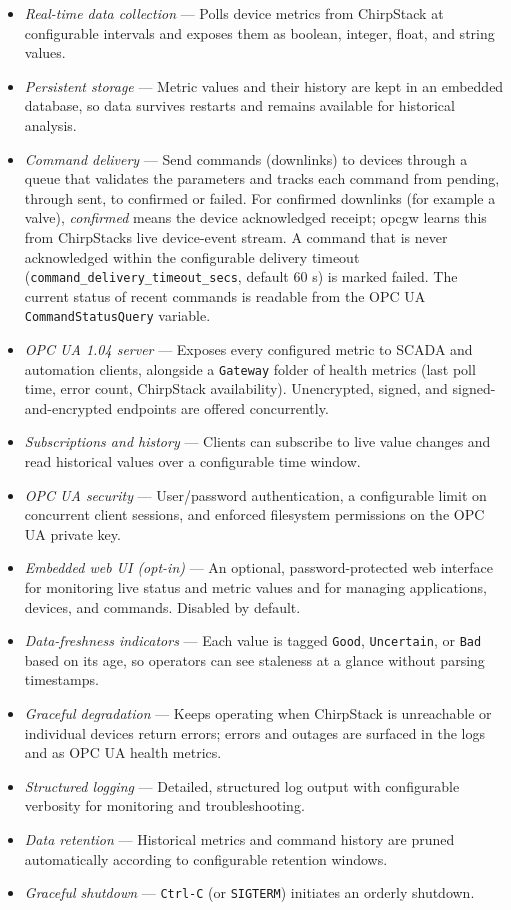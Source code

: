 \begin{itemize}
\item
  \emph{Real-time data collection} --- Polls device metrics from ChirpStack at configurable intervals and exposes them as boolean, integer, float, and string values.
\item
  \emph{Persistent storage} --- Metric values and their history are kept in an embedded database, so data survives restarts and remains available for historical analysis.
\item
  \emph{Command delivery} --- Send commands (downlinks) to devices through a queue that validates the parameters and tracks each command from pending, through sent, to confirmed or failed. For confirmed downlinks (for example a valve), \emph{confirmed} means the device acknowledged receipt; opcgw learns this from ChirpStack\textquotesingle s live device-event stream. A command that is never acknowledged within the configurable delivery timeout (\texttt{command\_delivery\_timeout\_secs}, default 60 s) is marked failed. The current status of recent commands is readable from the OPC UA \texttt{CommandStatusQuery} variable.
\item
  \emph{OPC UA 1.04 server} --- Exposes every configured metric to SCADA and automation clients, alongside a \texttt{Gateway} folder of health metrics (last poll time, error count, ChirpStack availability). Unencrypted, signed, and signed-and-encrypted endpoints are offered concurrently.
\item
  \emph{Subscriptions and history} --- Clients can subscribe to live value changes and read historical values over a configurable time window.
\item
  \emph{OPC UA security} --- User/password authentication, a configurable limit on concurrent client sessions, and enforced filesystem permissions on the OPC UA private key.
\item
  \emph{Embedded web UI (opt-in)} --- An optional, password-protected web interface for monitoring live status and metric values and for managing applications, devices, and commands. Disabled by default.
\item
  \emph{Data-freshness indicators} --- Each value is tagged \texttt{Good}, \texttt{Uncertain}, or \texttt{Bad} based on its age, so operators can see staleness at a glance without parsing timestamps.
\item
  \emph{Graceful degradation} --- Keeps operating when ChirpStack is unreachable or individual devices return errors; errors and outages are surfaced in the logs and as OPC UA health metrics.
\item
  \emph{Structured logging} --- Detailed, structured log output with configurable verbosity for monitoring and troubleshooting.
\item
  \emph{Data retention} --- Historical metrics and command history are pruned automatically according to configurable retention windows.
\item
  \emph{Graceful shutdown} --- \texttt{Ctrl-C} (or \texttt{SIGTERM}) initiates an orderly shutdown.
\end{itemize}

